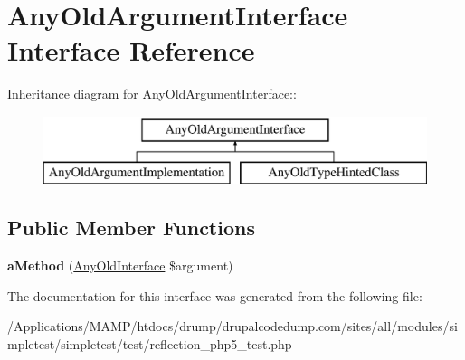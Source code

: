 \hypertarget{interface_any_old_argument_interface}{
\section{AnyOldArgumentInterface Interface Reference}
\label{interface_any_old_argument_interface}
}
Inheritance diagram for AnyOldArgumentInterface::\begin{figure}[H]
\begin{center}
\leavevmode
\includegraphics[height=2cm]{interface_any_old_argument_interface}
\end{center}
\end{figure}
\subsection*{Public Member Functions}
\begin{DoxyCompactItemize}
\item 
\hypertarget{interface_any_old_argument_interface_aab91025aa9d18274ede1ec53fc57b136}{
{\bfseries aMethod} (\hyperlink{interface_any_old_interface}{AnyOldInterface} \$argument)}
\label{interface_any_old_argument_interface_aab91025aa9d18274ede1ec53fc57b136}

\end{DoxyCompactItemize}


The documentation for this interface was generated from the following file:\begin{DoxyCompactItemize}
\item 
/Applications/MAMP/htdocs/drump/drupalcodedump.com/sites/all/modules/simpletest/simpletest/test/reflection\_\-php5\_\-test.php\end{DoxyCompactItemize}
